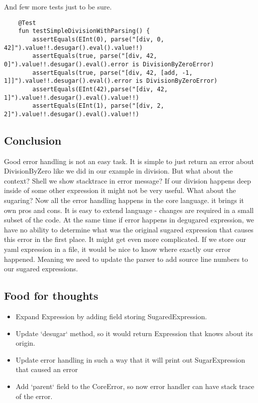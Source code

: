 \documentclass[11pt]{article}
\begin{document}
And few more tests just to be sure.

\begin{verbatim}
    @Test
    fun testSimpleDivisionWithParsing() {
        assertEquals(EInt(0), parse("[div, 0, 42]").value!!.desugar().eval().value!!)
        assertEquals(true, parse("[div, 42, 0]").value!!.desugar().eval().error is DivisionByZeroError)
        assertEquals(true, parse("[div, 42, [add, -1, 1]]").value!!.desugar().eval().error is DivisionByZeroError)
        assertEquals(EInt(42),parse("[div, 42, 1]").value!!.desugar().eval().value!!)
        assertEquals(EInt(1), parse("[div, 2, 2]").value!!.desugar().eval().value!!)
\end{verbatim}
\subsection{Conclusion}
\label{sec:orgffa0f4c}
Good error handling is not an easy task. It is simple to just return an error about DivisionByZero like we did in our example in division.
But what about the context? Shell we show stacktrace in error message? If our division happens deep inside of some other expression it might not be very useful.
What about the sugaring? Now all the error handling happens in the core language. it brings it own pros and cons. It is easy to extend language - changes are required in a small subset of the code.
At the same time if error happens in degugared expression, we have no ability to determine what was the original sugared expression that causes this error in the first place.
It might get even more complicated. If we store our yaml expression in a file, it would be nice to know where exactly our error happened. Meaning we need to update the parser to add source line numbers to our sugared expressions.

\subsection{Food for thoughts}
\label{sec:orgf452388}
\begin{itemize}
\item Expand Expression by adding field storing SugaredExpression.
\item Update `desugar` method, so it would return Expression that knows about its origin.
\item Update error handling in such a way that it will print out SugarExpression that caused an error
\item Add `parent` field to the CoreError, so now error handler can have stack trace of the error.
\end{itemize}
\end{document}
